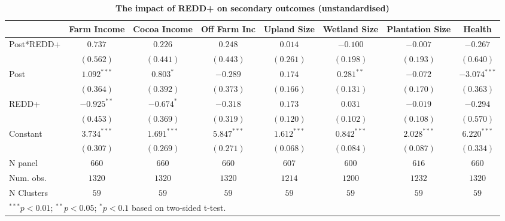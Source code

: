 \documentclass[
]{article}
\begin{document}
\begin{landscape}
\begin{table}[h]
\begin{center}
\begin{tabular}{l c c c c c c c}
\end{tabular}
\label{table:coefficients}
\end{center}
\end{table}

\begin{table}[h]
\caption{\textbf{The impact of REDD+ on secondary outcomes (unstandardised)}}
\begin{center}
\begin{tabular}{l c c c c c c c}
\hline
 & Farm Income & Cocoa Income & Off Farm Inc & Upland Size & Wetland Size & Plantation Size & Health \\
\hline
Post*REDD+ & $0.737$       & $0.226$       & $0.248$       & $0.014$       & $-0.100$      & $-0.007$      & $-0.267$       \\
           & $(0.562)$     & $(0.441)$     & $(0.443)$     & $(0.261)$     & $(0.198)$     & $(0.193)$     & $(0.640)$      \\
Post       & $1.092^{***}$ & $0.803^{*}$   & $-0.289$      & $0.174$       & $0.281^{**}$  & $-0.072$      & $-3.074^{***}$ \\
           & $(0.364)$     & $(0.392)$     & $(0.373)$     & $(0.166)$     & $(0.131)$     & $(0.170)$     & $(0.363)$      \\
REDD+      & $-0.925^{**}$ & $-0.674^{*}$  & $-0.318$      & $0.173$       & $0.031$       & $-0.019$      & $-0.294$       \\
           & $(0.453)$     & $(0.369)$     & $(0.319)$     & $(0.120)$     & $(0.102)$     & $(0.108)$     & $(0.570)$      \\
Constant   & $3.734^{***}$ & $1.691^{***}$ & $5.847^{***}$ & $1.612^{***}$ & $0.842^{***}$ & $2.028^{***}$ & $6.220^{***}$  \\
           & $(0.307)$     & $(0.269)$     & $(0.271)$     & $(0.068)$     & $(0.084)$     & $(0.087)$     & $(0.334)$      \\
\hline
N panel    & $660$         & $660$         & $660$         & $607$         & $600$         & $616$         & $660$          \\
Num. obs.  & $1320$        & $1320$        & $1320$        & $1214$        & $1200$        & $1232$        & $1320$         \\
N Clusters & $59$          & $59$          & $59$          & $59$          & $59$          & $59$          & $59$           \\
\hline
\multicolumn{8}{l}{\scriptsize{\parbox{.84\linewidth}{\vspace{2pt}$^{***}p<0.01$; $^{**}p<0.05$; $^{*}p<0.1$ based on two-sided t-test.\\
}}}
\end{tabular}
\end{center}
\end{table}
\end{landscape}
\end{document}
